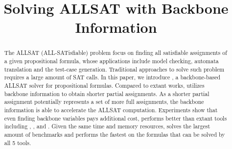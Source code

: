 \documentclass{article}
\begin{document}
\title{Solving ALLSAT with Backbone Information}
\maketitle
\begin{abstract}
The ALLSAT (ALL-SATisfiable) problem focus on finding all satisfiable assignments of a given propositional formula, whose applications include model checking, automata translation and the test-case generation. Traditional approaches to solve such problem requires a large amount of SAT calls.
In this paper, we introduce \tool, a backbone-based ALLSAT solver for propositional formulas. Compared to extant works, \tool utilizes backbone information to obtain shorter partial assignments. As a shorter partial assignment potentially represents a set of more full assignments, the backbone information is able to accelerate the ALLSAT computation. 
Experiments show that even finding backbone variables pays additional cost, \tool performs better than extant tools including \ctool, \bc, \nbc and \bdd.
Given the same time and memory resources, \tool solves the largest amount of benchmarks
and performs the fastest on the formulas that can be solved by all 5 tools.
\end{abstract}








\end{document}
